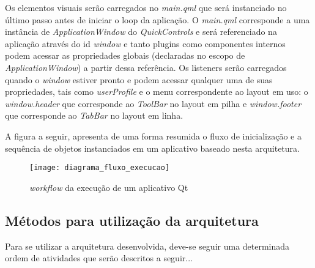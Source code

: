 Os elementos visuais serão carregados no \textit{main.qml} que será instanciado no último passo antes de iniciar o loop da aplicação. O \textit{main.qml} corresponde a uma instância de \textit{ApplicationWindow} do \textit{QuickControls} e será referenciado na aplicação através do id \textit{window} e tanto plugins como componentes internos podem acessar as propriedades globais (declaradas no escopo de \textit{ApplicationWindow}) a partir dessa referência. Os listeners serão carregados quando o \textit{window} estiver pronto e podem acessar qualquer uma de suas propriedades, tais como \textit{userProfile} e o menu correspondente ao layout em uso: o \textit{window.header} que corresponde ao \textit{ToolBar} no layout em pilha e \textit{window.footer} que corresponde ao \textit{TabBar} no layout em linha.

A figura a seguir, apresenta de uma forma resumida o fluxo de inicialização e a sequência de objetos instanciados em um aplicativo baseado nesta arquitetura.

\begin{figure}[H]
	\texttt{[image: diagrama\_fluxo\_execucao]}
	\centering
	\caption{\textit{workflow} da execução de um aplicativo Qt}
\end{figure}


\subsection{Métodos para utilização da arquitetura}
Para se utilizar a arquitetura desenvolvida, deve-se seguir uma determinada ordem de atividades que serão descritos a seguir...